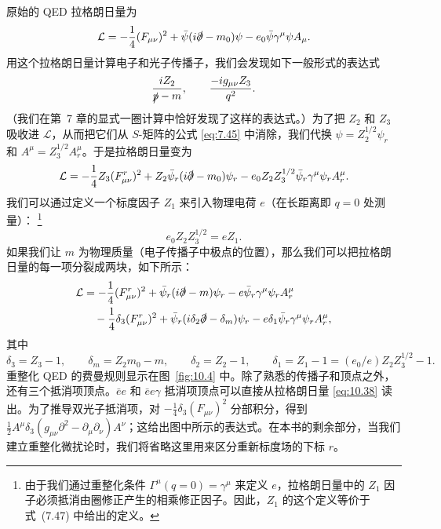 原始的 QED 拉格朗日量为
\begin{equation}
  \mathcal{L} = -\frac{1}{4}(F_{\mu\nu})^2
    + \bar{\psi}(i\slashed{\partial} - m_0)\psi - e_0\bar{\psi}\gamma^\mu\psi
      A_\mu .
\end{equation}
用这个拉格朗日量计算电子和光子传播子，我们会发现如下一般形式的表达式
\begin{equation}
  \frac{iZ_2}{\slashed{p}-m},\qquad \frac{-ig_{\mu\nu}Z_3}{q^2} .
\end{equation}
（我们在第~7 章的显式一圈计算中恰好发现了这样的表达式。）为了把 $Z_2$ 和 $Z_3$ 吸收进 $\mathcal{L}$，从而把它们从 $S$-矩阵的公式 \eqref{eq:7.45} 中消除，我们代换 $\psi = Z_2^{1/2}\psi_r$ 和 $A^\mu = Z_3^{1/2}A_r^\mu$。于是拉格朗日量变为
\begin{equation}
  \mathcal{L} = -\frac{1}{4}Z_3(F_{\mu\nu}^r)^2 + Z_2\bar{\psi}_r
    (i\slashed{\partial} - m_0)\psi_r - e_0Z_2Z_3^{1/2}\bar{\psi}_r\gamma^\mu
      \psi_r A_r^\mu .
  \label{eq:10.36}
\end{equation}
我们可以通过定义一个标度因子 $Z_1$ 来引入物理电荷 $e$（在长距离即 $q = 0$ 处测量）：%
\footnote{由于我们通过重整化条件 $\Gamma^\mu(q=0) = \gamma^\mu$ 来定义 $e$，拉格朗日量中的 $Z_1$ 因子必须抵消由圈修正产生的相乘修正因子。因此，$Z_1$ 的这个定义等价于式~(7.47) 中给出的定义。}
\begin{equation}
  e_0Z_2Z_3^{1/2} = eZ_1 .
  \label{eq:10.37}
\end{equation}
如果我们让 $m$ 为物理质量（电子传播子中极点的位置），那么我们可以把拉格朗日量的每一项分裂成两块，如下所示：
\begin{equation}
  \begin{aligned}
    \mathcal{L} &= -\frac{1}{4}(F_{\mu\nu}^r)^2 + \bar{\psi}_r(i\slashed{\partial}
      - m)\psi_r - e\bar{\psi}_r\gamma^\mu\psi_r A_r^\mu\\
    &\quad - \frac{1}{4}\delta_3(F_{\mu\nu}^r)^2 + \bar{\psi}_r(i\delta_2\slashed{\partial}
      - \delta_m)\psi_r - e\delta_1\bar{\psi}_r\gamma^\mu\psi_r A_r^\mu ,
  \end{aligned}
  \label{eq:10.38}
\end{equation}
其中
\begin{equation}
  \delta_3 = Z_3 - 1,\qquad
  \delta_m = Z_2m_0 - m,\qquad
  \delta_2 = Z_2 - 1,\qquad
  \delta_1 = Z_1 - 1 = (e_0/e)Z_2Z_3^{1/2} - 1 .
\end{equation}
重整化 QED 的费曼规则显示在图~\ref{fig:10.4} 中。除了熟悉的传播子和顶点之外，还有三个抵消项顶点。$\bar{e}e$ 和 $\bar{e}e\gamma$ 抵消项顶点可以直接从拉格朗日量 \eqref{eq:10.38} 读出。为了推导双光子抵消项，对 $-\tfrac{1}{4}\delta_3(F_{\mu\nu})^2$ 分部积分，得到 $\tfrac{1}{2}A^\mu\delta_3(g_{\mu\nu}\partial^2 - \partial_\mu\partial_\nu)A^\nu$；这给出图中所示的表达式。在本书的剩余部分，当我们建立重整化微扰论时，我们将省略这里用来区分重新标度场的下标 $r$。

